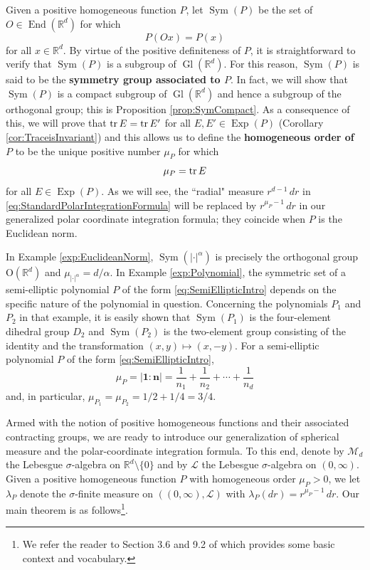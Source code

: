 \documentclass[smallextended]{svjour3}
\theoremstyle{remark}
\newcommand\End{\operatorname{End}} %
\newcommand\Gl{\operatorname{Gl}} %
\newcommand\OdR{\mbox{O}(\mathbb{R}^d)} %
\newcommand\Sym{\operatorname{Sym}}
\newcommand\Exp{\operatorname{Exp}}
\begin{document}
\noindent Given a positive homogeneous function $P$, let $\Sym(P)$ be the set of $O\in\End(\mathbb{R}^d)$ for which
\begin{equation*}
P(Ox)=P(x)
\end{equation*}
for all $x\in\mathbb{R}^d$. By virtue of the positive definiteness of $P$, it is straightforward to verify that $\Sym(P)$ is a subgroup of $\Gl(\mathbb{R}^d)$. For this reason, $\Sym(P)$ is said to be the \textbf{symmetry group associated to $P$}. In fact, we will show that $\Sym(P)$ is a compact subgroup of $\Gl(\mathbb{R}^d)$ and hence a subgroup of the orthogonal group; this is Proposition \ref{prop:SymCompact}. As a consequence of this, we will prove that $\tr E=\tr E'$ for all $E,E'\in\Exp(P)$ (Corollary \ref{cor:TraceisInvariant}) and this allows us to define the \textbf{homogeneous order of $P$} to be the unique positive number $\mu_P$ for which
\begin{equation*}
\mu_P=\tr E
\end{equation*}
for all $E\in\Exp(P)$. As we will see, the ``radial" measure $r^{d-1}\,dr$ in \eqref{eq:StandardPolarIntegrationFormula} will be replaced by $r^{\mu_P-1}\,dr$ in our generalized polar coordinate integration formula; they coincide when $P$ is the Euclidean norm.

\begin{example}\normalfont
In Example \ref{exp:EuclideanNorm}, $\Sym(|\cdot|^\alpha)$ is precisely the orthogonal group $\OdR$ and $\mu_{|\cdot|^\alpha}=d/\alpha$. In Example \ref{exp:Polynomial}, the symmetric set of a semi-elliptic polynomial $P$ of the form \eqref{eq:SemiEllipticIntro} depends on the specific nature of the polynomial in question. Concerning the polynomials $P_1$ and $P_2$ in that example, it is easily shown that $\Sym(P_1)$ is the four-element dihedral group $D_2$ and $\Sym(P_2)$ is the two-element group consisting of the identity and the transformation $(x,y)\mapsto (x,-y)$. For a semi-elliptic polynomial $P$ of the form \eqref{eq:SemiEllipticIntro}, 
\begin{equation*}
    \mu_P=|\mathbf{1}:\mathbf{n}|=\frac{1}{n_1}+\frac{1}{n_2}+\cdots+\frac{1}{n_d}
\end{equation*}
and, in particular, $\mu_{P_1}=\mu_{P_2}=1/2+1/4=3/4.$
\end{example}

\noindent Armed with the notion of positive homogeneous functions and their associated contracting groups, we are ready to introduce our generalization of spherical measure and the polar-coordinate integration formula. To this end, denote by $\mathcal{M}_d$ the Lebesgue $\sigma$-algebra on $\mathbb{R}^d\setminus\{0\}$ and by $\mathcal{L}$ the Lebesgue $\sigma$-algebra on $(0,\infty)$. Given a positive homogeneous function $P$ with homogeneous order $\mu_P>0$, we let $\lambda_P$ denote the $\sigma$-finite measure on $((0,\infty),\mathcal{L})$ with $\lambda_P(dr)=r^{\mu_P-1}\,dr$. Our main theorem is as follows\footnote{We refer the reader to Section 3.6 and 9.2 of \cite{bogachev_measure_2007} which provides some basic context and vocabulary.}. 
\end{document}

